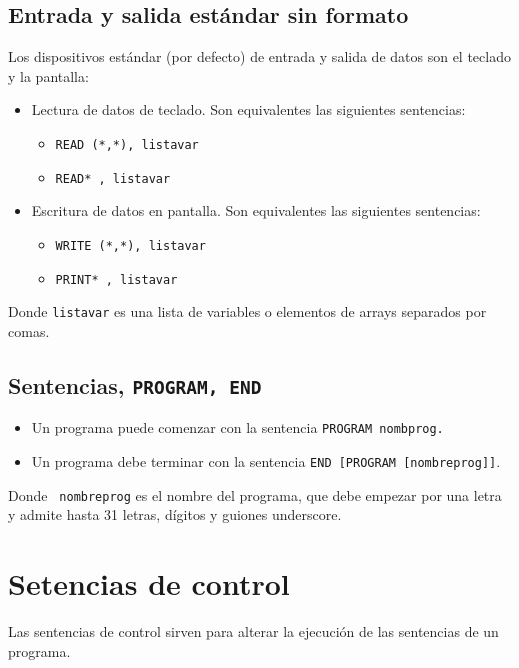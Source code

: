 \subsection{Entrada y salida estándar sin formato}


Los dispositivos estándar (por defecto) de entrada y salida de datos son el teclado y la pantalla:

\begin{itemize}
	\item Lectura de datos de teclado. Son equivalentes las siguientes sentencias:
	      \begin{itemize}
		      \item {\tt READ (*,*), listavar}
		      \item {\tt READ* , listavar}
	      \end{itemize}

	\item Escritura de datos en pantalla. Son equivalentes las siguientes sentencias:
	      \begin{itemize}
		      \item {\tt WRITE (*,*), listavar}
		      \item {\tt PRINT* , listavar}
	      \end{itemize}
\end{itemize}
Donde {\tt listavar} es una lista de variables o elementos de arrays separados por comas.

\subsection{Sentencias, {\tt PROGRAM, END}}

\begin{itemize}
	\item Un programa puede comenzar con la sentencia {\tt PROGRAM nombprog.}
	\item Un programa debe terminar con la sentencia {\tt END  [PROGRAM [nombreprog]]}.
\end{itemize}
Donde \texttt{ nombreprog} es el nombre del programa, que debe empezar por una letra y admite hasta 31 letras, dígitos y guiones underscore.

\section{Setencias de control}

Las sentencias de control sirven para alterar la ejecución de las sentencias de un programa.



